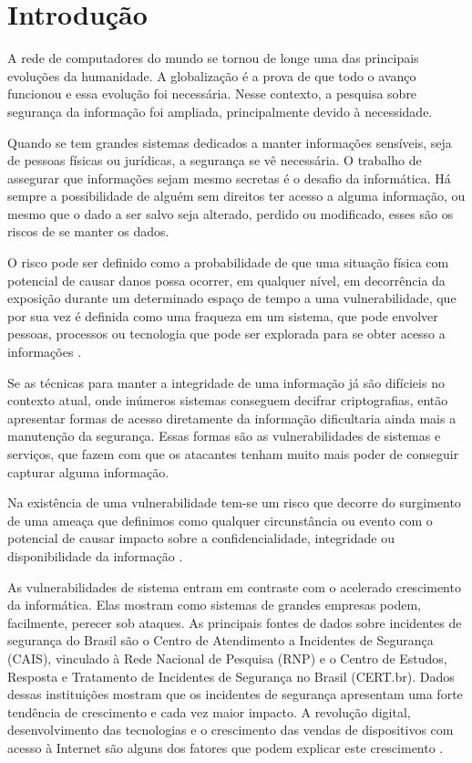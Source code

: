 \chapter[Introdução]{Introdução}

A rede de computadores do mundo se tornou de longe uma das principais evoluções da humanidade. A globalização é a prova de que todo o avanço funcionou e essa evolução foi necessária. Nesse contexto, a pesquisa sobre segurança da informação foi ampliada, principalmente devido à necessidade.

Quando se tem grandes sistemas dedicados a manter informações sensíveis, seja de pessoas físicas ou jurídicas, a segurança se vê necessária. O trabalho de assegurar que informações sejam mesmo secretas é o desafio da informática. Há sempre a possibilidade de alguém sem direitos ter acesso a alguma informação, ou mesmo que o dado a ser salvo seja alterado, perdido ou modificado, esses são os riscos de se manter os dados. 

O risco pode ser definido como a probabilidade de que uma situação física com potencial de causar danos possa ocorrer, em qualquer nível, em decorrência da exposição durante um determinado espaço de tempo a uma vulnerabilidade, que por sua vez é definida como uma fraqueza em um sistema, que pode envolver pessoas, processos ou tecnologia que pode ser explorada para se obter acesso a informações \cite{Peotta2006}. 

Se as técnicas para manter a integridade de uma informação já são difícieis no contexto atual, onde inúmeros sistemas conseguem decifrar criptografias, então apresentar formas de acesso diretamente da informação dificultaria ainda mais a manutenção da segurança. Essas formas são as vulnerabilidades de sistemas e serviços, que fazem com que os atacantes tenham muito mais poder de conseguir capturar alguma informação. 

Na existência de uma vulnerabilidade tem-se um risco que decorre do surgimento de uma ameaça que definimos como qualquer circunstância ou evento com o potencial de causar impacto sobre a confidencialidade, integridade ou disponibilidade da informação \cite{Peotta2006}.

As vulnerabilidades de sistema entram em contraste com o acelerado crescimento da informática. Elas mostram como sistemas de grandes empresas podem, facilmente, perecer sob ataques. As principais fontes de dados sobre incidentes de segurança do Brasil são o Centro de Atendimento a Incidentes de Segurança (CAIS), vinculado à Rede Nacional de Pesquisa (RNP) e o Centro de Estudos, Resposta e Tratamento de Incidentes de Segurança no Brasil (CERT.br). Dados dessas instituições mostram que os incidentes de segurança apresentam uma forte tendência de crescimento e cada vez maior impacto. A revolução digital, desenvolvimento das tecnologias e o crescimento das vendas de dispositivos com acesso à Internet são alguns dos fatores que podem explicar este crescimento \cite{Miani2013}.

